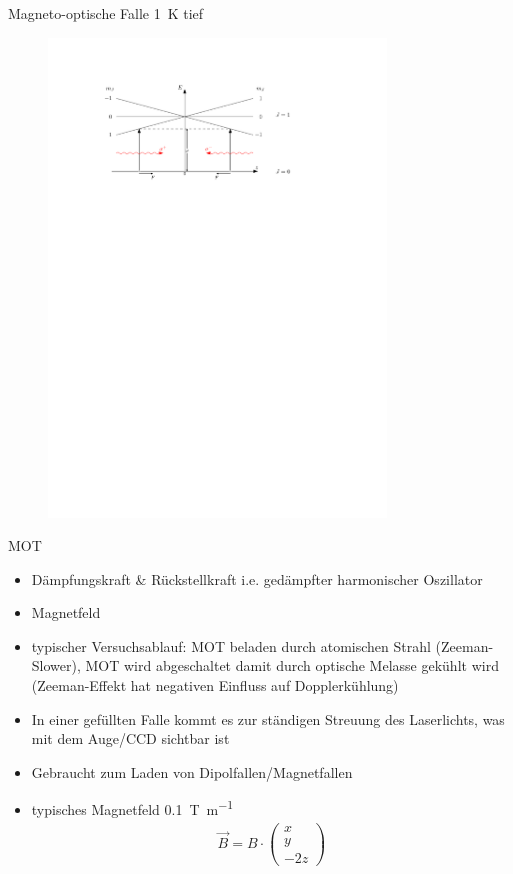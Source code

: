 \documentclass[12pt]{beamer}
\begin{document}
\begin{frame}{Magneto-optische Falle}
\SI{1}{K} tief

\begin{figure}[h]
	\centering
	\includegraphics[width=0.8\textwidth]{./figures/mot.pdf}
\end{figure}
\end{frame}

\begin{frame}{MOT}
	\begin{itemize}
		\item Dämpfungskraft \& Rückstellkraft i.e. gedämpfter harmonischer Oszillator
		\item Magnetfeld
		\item typischer Versuchsablauf: MOT beladen durch atomischen Strahl (Zeeman-Slower), MOT wird abgeschaltet damit durch optische Melasse gekühlt wird (Zeeman-Effekt hat negativen Einfluss auf Dopplerkühlung)
		\item In einer gefüllten Falle kommt es zur ständigen Streuung des Laserlichts, was mit dem Auge/CCD sichtbar ist
		\item Gebraucht zum Laden von Dipolfallen/Magnetfallen
		\item typisches Magnetfeld \SI{0.1}{\tesla\per\metre}
		\begin{align}
		\vec{B} = B \cdot \begin{pmatrix}
		x \\ y \\ -2z
		\end{pmatrix}
		\end{align}
	\end{itemize}
\end{frame}
\end{document}

